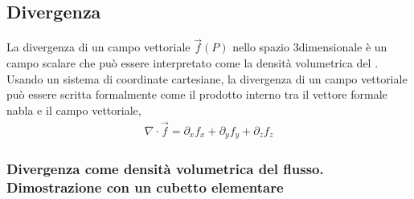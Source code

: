 \documentclass[letterpaper,10pt,italian]{jupyterBook}
\begin{document}
\subsection{Divergenza}
\label{\detokenize{ch/vector-calculus/derivatives:divergenza}}\label{\detokenize{ch/vector-calculus/derivatives:vector-calculus-derivatives-divergence}}
\sphinxAtStartPar
La divergenza di un campo vettoriale \(\vec{f}(P)\) nello spazio 3\sphinxhyphen{}dimensionale è un campo scalare che può essere interpretato come la densità volumetrica del {\hyperref[\detokenize{ch/vector-calculus/integrals:vector-calculus-integrals-surface-flux}]{}}. Usando un sistema di coordinate cartesiane, la divergenza di un campo vettoriale può essere scritta formalmente come il prodotto interno tra il vettore formale nabla e il campo vettoriale,
\begin{equation*}
\begin{split}\nabla \cdot \vec{f} = \partial_x f_x + \partial_y f_y + \partial_z f_z\end{split}
\end{equation*}\subsubsection*{Divergenza come densità volumetrica del flusso. Dimostrazione con un cubetto elementare}
\end{document}

